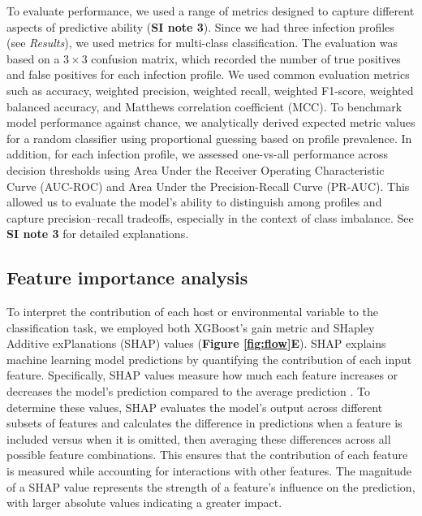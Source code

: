 \documentclass[oneside, a4paper, onecolumn, 11pt]{article}
\begin{document}
To evaluate performance, we used a range of metrics designed to capture different aspects of predictive ability \citep{Poisot2023-jo, Grandini2020-nl} (\textbf{SI note 3}). Since we had three infection profiles (see \textit{Results}), we used metrics for multi-class classification. The evaluation was based on a $3\times3$ confusion matrix, which recorded the number of true positives and false positives for each infection profile. We used common evaluation metrics such as accuracy, weighted precision, weighted recall, weighted F1-score, weighted balanced accuracy, and Matthews correlation coefficient (MCC). To benchmark model performance against chance, we analytically derived expected metric values for a random classifier using proportional guessing based on profile prevalence. In addition, for each infection profile, we assessed one-vs-all performance across decision thresholds using Area Under the Receiver Operating Characteristic Curve (AUC-ROC) and Area Under the Precision-Recall Curve (PR-AUC). This allowed us to evaluate the model’s ability to distinguish among profiles and capture precision–recall tradeoffs, especially in the context of class imbalance. See \textbf{SI note 3} for detailed explanations.

\subsection*{Feature importance analysis}
To interpret the contribution of each host or environmental variable to the classification task, we employed both XGBoost’s gain metric and SHapley Additive exPlanations (SHAP) values (\textbf{Figure \ref{fig:flow}E}). SHAP explains machine learning model predictions by quantifying the contribution of each input feature. Specifically, SHAP values measure how much each feature increases or decreases the model’s prediction compared to the average prediction \citep{Lundberg2017-dr}. To determine these values, SHAP evaluates the model’s output across different subsets of features and calculates the difference in predictions when a feature is included versus when it is omitted, then averaging these differences across all possible feature combinations. This ensures that the contribution of each feature is measured while accounting for interactions with other features. The magnitude of a SHAP value represents the strength of a feature’s influence on the prediction, with larger absolute values indicating a greater impact. 
\end{document}
